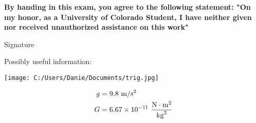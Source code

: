 \documentclass[11pt]{article}
\begin{document}
\vspace{.15in}

{\bf By handing in this exam, you agree to the following statement: "On my honor, as a University of Colorado Student, I have neither given nor received unauthorized assistance on this work"}

\begin{center}
Signature\uline{\hspace{4in}}
\end{center}

Possibly useful information:\\
\begin{minipage}[t]{.25\lw}
\vspace{0in}
\flushleft
\texttt{[image: C:/Users/Danie/Documents/trig.jpg]}
\end{minipage}\hfill
\begin{minipage}[t]{.7\lw}
\begingroup
\addtolength{\jot}{-1em}
\begin{align*}
g&=9.8\ {\rm m}/{\rm s}^2\\
G&=6.67\times10^{-11}\ \dfrac{\text{N}\cdot\text{m}^2}{\text{kg}^2}
\end{align*}
\endgroup
\end{minipage}


\newpage


\normalsize

\\[.2in]
\end{document}
